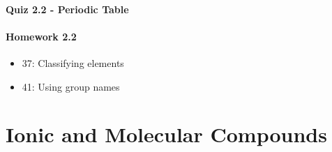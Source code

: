 \documentclass[12pt, openany, letterpaper]{memoir}
\begin{document}
\paragraph*{Quiz 2.2 - Periodic Table}
\paragraph*{Homework 2.2}
\begin{itemize}
  \item 37: Classifying elements
  \item 41: Using group names
\end{itemize}

\section{Ionic and Molecular Compounds}
\end{document}
